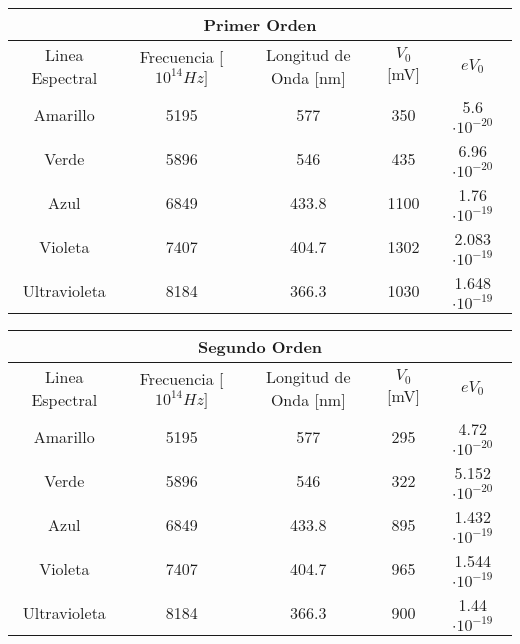 \documentclass[a4paper,12pt]{report}
\begin{document}
    \begin{table}[htbp!]
        \centering
        \begin{adjustbox}{width=\linewidth}
        \begin{tabular}{|c|c|c|c|c|}
        \hline
        \multicolumn{5}{|c|}{Primer Orden} \\
        \hline
        Linea Espectral & Frecuencia [$10^{14} Hz]$ & Longitud de Onda [nm] & $V_0$ [mV] & $eV_0 $\\
        \hline
        Amarillo & 5195 & 577 & 350 & 5.6 $\cdot 10^{-20}$ \\
        \hline
        Verde & 5896 & 546 & 435 & 6.96 $\cdot 10^{-20}$\\
        \hline
        Azul & 6849 & 433.8 & 1100 & 1.76 $\cdot 10^{-19}$\\
        \hline
        Violeta & 7407 & 404.7 & 1302 & 2.083 $\cdot 10^{-19}$\\
        \hline
        Ultravioleta & 8184 & 366.3 & 1030 & 1.648 $\cdot 10^{-19}$\\
        \hline
        \end{tabular}
        \end{adjustbox}
    \end{table}

    \begin{table}[htbp!]
        \centering
        \begin{adjustbox}{width=\linewidth}
        \begin{tabular}{|c|c|c|c|c|}
        \hline
        \multicolumn{5}{|c|}{Segundo Orden} \\
        \hline
        Linea Espectral & Frecuencia [$10^{14} Hz]$ & Longitud de Onda [nm] & $V_0$ [mV]& $eV_0 $\\
        \hline
        Amarillo & 5195 & 577 & 295 & 4.72 $\cdot 10^{-20}$\\
        \hline
        Verde & 5896 & 546 & 322 & 5.152 $\cdot 10^{-20}$\\
        \hline
        Azul & 6849 & 433.8 & 895 & 1.432 $\cdot 10^{-19}$\\
        \hline
        Violeta & 7407 & 404.7 & 965 & 1.544 $\cdot 10^{-19}$\\
        \hline
        Ultravioleta & 8184 & 366.3 & 900 & 1.44 $\cdot 10^{-19}$\\
        \hline
        \end{tabular}
        \end{adjustbox}
    \end{table}
\end{document}
